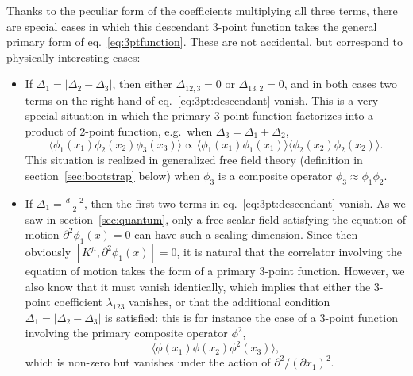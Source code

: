 \documentclass[a4paper,12pt]{article}
\numberwithin{equation}{section}
\begin{document}
Thanks to the peculiar form of the coefficients multiplying all three terms, there are special cases in which this descendant 3-point function takes the general primary form of eq.~\eqref{eq:3ptfunction}.
These are not accidental, but correspond to physically interesting cases:
\begin{itemize}

\item
If $\Delta_1 = \left| \Delta_2 - \Delta_3 \right|$, then either $\Delta_{12,3} = 0$ or $\Delta_{13,2} = 0$, and in both cases two terms on the right-hand of eq.~\eqref{eq:3pt:descendant} vanish. This is a very special situation in which the primary 3-point function factorizes into a product of 2-point function, e.g.~when $\Delta_3 = \Delta_1 + \Delta_2$,
\begin{equation}
	\langle \phi_1(x_1) \phi_2(x_2) \phi_3(x_3) \rangle
	\propto \langle \phi_1(x_1) \phi_1(x_1) \rangle
	\langle \phi_2(x_2) \phi_2(x_2) \rangle.
\end{equation}
This situation is realized in generalized free field theory (definition in section~\ref{sec:bootstrap} below) when $\phi_3$ is a composite operator $\phi_3 \approx \phi_1 \phi_2$.

\item
If $\Delta_1 = \frac{d-2}{2}$, then the first two terms in eq.~\eqref{eq:3pt:descendant} vanish. As we saw in section~\ref{sec:quantum}, only a free scalar field satisfying the equation of motion $\partial^2 \phi_1(x) = 0$ can have such a scaling dimension. Since then obviously $\left[ K^\mu, \partial^2 \phi_1(x) \right] = 0$, it is natural that the correlator involving the equation of motion takes the form of a primary 3-point function. However, we also know that it must vanish identically, which implies that either the 3-point coefficient $\lambda_{123}$ vanishes, or that the additional condition $\Delta_1 = \left| \Delta_2 - \Delta_3 \right|$ is satisfied: this is for instance the case of a 3-point function involving the primary composite operator $\phi^2$,
\begin{equation}
	\langle \phi(x_1) \phi(x_2) \phi^2(x_3) \rangle,
\end{equation}
which is non-zero but vanishes under the action of $\partial^2/(\partial x_1)^2$.

\end{itemize}
\end{document}

